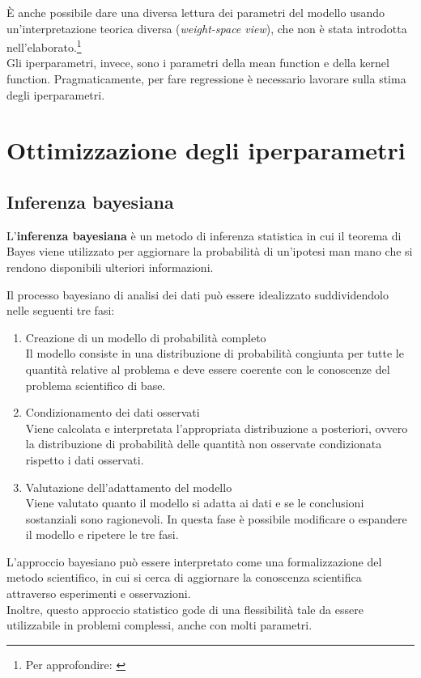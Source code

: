 È anche possibile dare una diversa lettura dei parametri del modello usando un'interpretazione teorica diversa (\textit{weight-space view}), che non è stata introdotta nell'elaborato.\footnote{Per approfondire: \cite{rasmussen_gaussian_2006}}\\

Gli iperparametri, invece, sono i parametri della mean function e della kernel function. Pragmaticamente, per fare regressione è necessario lavorare sulla stima degli iperparametri.


\newpage


\section{Ottimizzazione degli iperparametri}

\subsection{Inferenza bayesiana}
L'\textbf{inferenza bayesiana} è un metodo di inferenza statistica in cui il teorema di Bayes viene utilizzato per aggiornare la probabilità di un'ipotesi man mano che si rendono disponibili ulteriori  informazioni. 

Il processo bayesiano di analisi dei dati può essere idealizzato suddividendolo nelle seguenti tre fasi:
\begin{enumerate}
    \item Creazione di un modello di probabilità completo\\
    Il modello consiste in una distribuzione di probabilità congiunta per tutte le quantità relative al problema e deve essere coerente con le conoscenze del problema scientifico di base.
    \item Condizionamento dei dati osservati\\ Viene calcolata e interpretata l'appropriata distribuzione a posteriori, ovvero la distribuzione di probabilità delle quantità non osservate condizionata rispetto i dati osservati.
    \item Valutazione dell'adattamento del modello\\
    Viene valutato quanto il modello si adatta ai dati e se le conclusioni sostanziali sono ragionevoli. In questa fase è possibile modificare o espandere il modello e ripetere le tre fasi.
\end{enumerate}
L'approccio bayesiano può essere interpretato come una formalizzazione del metodo scientifico, in cui si cerca di aggiornare la conoscenza scientifica attraverso esperimenti e osservazioni.\\
Inoltre, questo approccio statistico gode di una flessibilità tale da essere utilizzabile in problemi complessi, anche con molti parametri.\\

